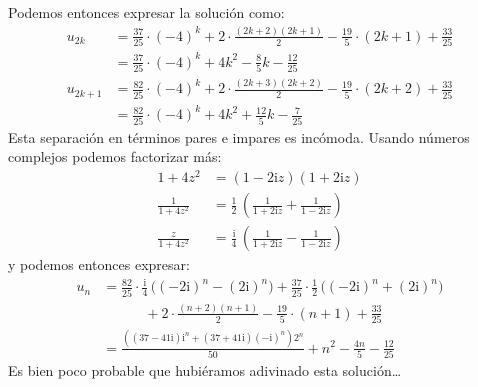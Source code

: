   Podemos entonces expresar la solución como:
  \begin{align*}
    u_{2 k}
      &= \frac{37}{25} \cdot (-4)^k
	   + 2 \cdot \frac{(2 k + 2) (2 k + 1)}{2}
	   - \frac{19}{5} \cdot (2 k + 1)
	   + \frac{33}{25} \\
      &= \frac{37}{25} \cdot (-4)^k
	   + 4 k^2 - \frac{8}{5} k - \frac{12}{25} \\
    u_{2 k + 1}
      &= \frac{82}{25} \cdot (-4)^k
	   + 2 \cdot \frac{(2 k + 3) (2 k + 2)}{2}
	   - \frac{19}{5} \cdot (2 k + 2)
	   + \frac{33}{25} \\
      &= \frac{82}{25} \cdot (-4)^k
	   + 4 k^2
	   + \frac{12}{5} k
	   - \frac{7}{25}
  \end{align*}
  Esta separación en términos pares e impares es incómoda.
  Usando números complejos podemos factorizar más:%
  \begin{align*}
    1 + 4 z^2
      &= (1 - 2 \mathrm{i} z) (1 + 2 \mathrm{i} z) \\
    \frac{1}{1 + 4 z^2}
      &= \frac{1}{2} \, \left(
			  \frac{1}{1 + 2 \mathrm{i} z}
				     + \frac{1}{1 - 2 \mathrm{i} z}
			\right) \\
    \frac{z}{1 + 4 z^2}
      &= \frac{\mathrm{i}}{4} \,
	   \left(
	     \frac{1}{1 + 2 \mathrm{i} z}
	       - \frac{1}{1 - 2 \mathrm{i} z}
	   \right)
  \end{align*}
  y podemos entonces expresar:
  \begin{align*}
    u_n
      &= \frac{82}{25} \cdot
	   \frac{\mathrm{i}}{4} \,
	     \bigl(
	       (-2 \mathrm{i})^n - (2 \mathrm{i})^n
	     \bigr)
	   + \frac{37}{25} \cdot
		\frac{1}{2} \,
		  \bigl(
		    (-2 \mathrm{i})^n + (2 \mathrm{i})^n
		  \bigr) \\
      &\hspace{3em}
	   + 2 \cdot \frac{(n + 2) (n + 1)}{2}
	   - \frac{19}{5} \cdot (n + 1)
	   + \frac{33}{25} \\
      &= \frac{\left(
		 (37 - 41 \mathrm{i}) \mathrm{i}^n
		    + (37 + 41 \mathrm{i}) (-\mathrm{i})^n
	       \right) 2^n
	      }{50}
	   + n^2
	   - \frac{4 n}{5}
	   - \frac{12}{25}
  \end{align*}
  Es bien poco probable que hubiéramos adivinado esta solución\ldots

